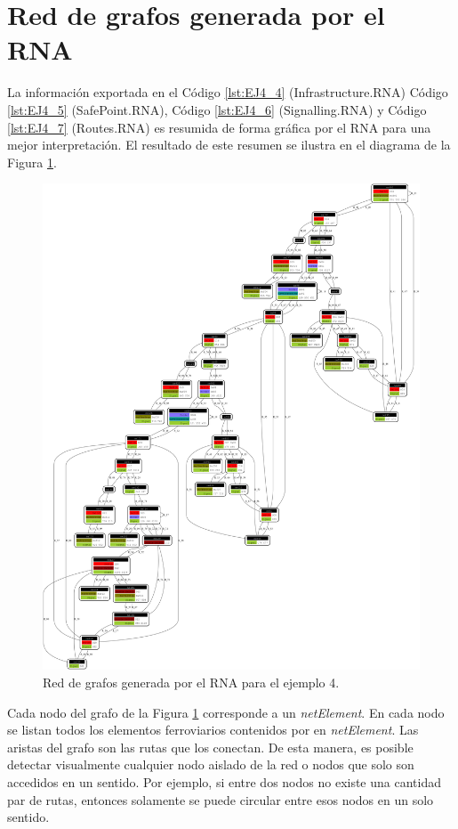 \section{Red de grafos generada por el RNA}
	
	La información exportada en el Código \ref{lst:EJ4_4} (Infrastructure.RNA) Código \ref{lst:EJ4_5} (SafePoint.RNA), Código \ref{lst:EJ4_6} (Signalling.RNA) y Código \ref{lst:EJ4_7} (Routes.RNA) es resumida de forma gráfica por el RNA para una mejor interpretación. El resultado de este resumen se ilustra en el diagrama de la Figura \ref{fig:EJ4_8}.
	
	\begin{figure}[H]
		\centering
		\includegraphics[origin = c, width=\textwidth]{Figuras/Graph_4}
		\centering\caption{Red de grafos generada por el RNA para el ejemplo 4.}
		\label{fig:EJ4_8}
	\end{figure}
	
	Cada nodo del grafo de la Figura \ref{fig:EJ4_8} corresponde a un \textit{netElement}. En cada nodo se listan todos los elementos ferroviarios contenidos por en \textit{netElement}. Las aristas del grafo son las rutas que los conectan. De esta manera, es posible detectar visualmente cualquier nodo aislado de la red o nodos que solo son accedidos en un sentido. Por ejemplo, si entre dos nodos no existe una cantidad par de rutas, entonces solamente se puede circular entre esos nodos en un solo sentido.